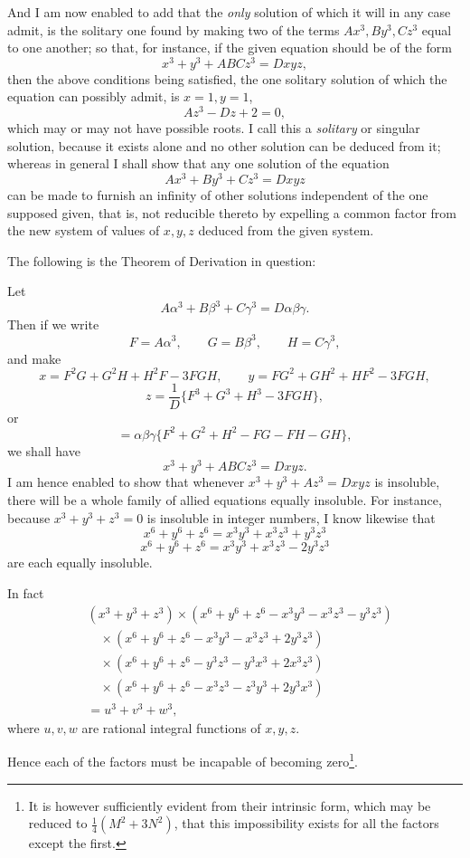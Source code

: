 \documentclass[11pt]{article}
\newcommand{\sourcepage}[1]{\marginpar{\scriptsize p.~#1}}
\begin{document}
\sourcepage{111}
And I am now enabled to add that the \emph{only} solution of which it will in any case admit, is the solitary one found by making two of the terms $Ax^3,By^3,Cz^3$ equal to one another; so that, for instance, if the given equation should be of the form
\[
x^3+y^3+ABCz^3=Dxyz,
\]
then the above conditions being satisfied, the one solitary solution of which the equation can possibly admit, is $x=1,y=1$,
\[
Az^3-Dz+2=0,
\]
which may or may not have possible roots. I call this a \emph{solitary} or singular solution, because it exists alone and no other solution can be deduced from it; whereas in general I shall show that any one solution of the equation
\[
Ax^3+By^3+Cz^3=Dxyz
\]
can be made to furnish an infinity of other solutions independent of the one supposed given, that is, not reducible thereto by expelling a common factor from the new system of values of $x,y,z$ deduced from the given system.

The following is the Theorem of Derivation in question:

Let
\[
A\alpha^3+B\beta^3+C\gamma^3=D\alpha\beta\gamma.
\]
Then if we write
\[
F=A\alpha^3,\qquad G=B\beta^3,\qquad H=C\gamma^3,
\]
and make
\[
x=F^2G+G^2H+H^2F-3FGH,
\qquad
y=FG^2+GH^2+HF^2-3FGH,
\]
\[
z=\frac{1}{D}\{F^3+G^3+H^3-3FGH\},
\]
or
\[
=\alpha\beta\gamma\{F^2+G^2+H^2-FG-FH-GH\},
\]
we shall have
\[
x^3+y^3+ABCz^3=Dxyz.
\]
I am hence enabled to show that whenever $x^3+y^3+Az^3=Dxyz$ is insoluble, there will be a whole family of allied equations equally insoluble. For instance, because $x^3+y^3+z^3=0$ is insoluble in integer numbers, I know likewise that
\[
x^6+y^6+z^6=x^3y^3+x^3z^3+y^3z^3
\]
\[
x^6+y^6+z^6=x^3y^3+x^3z^3-2y^3z^3
\]
are each equally insoluble.

\sourcepage{112}
In fact
\[
\begin{aligned}
&(x^3+y^3+z^3)\times(x^6+y^6+z^6-x^3y^3-x^3z^3-y^3z^3)\\
&\quad\times(x^6+y^6+z^6-x^3y^3-x^3z^3+2y^3z^3)\\
&\quad\times(x^6+y^6+z^6-y^3z^3-y^3x^3+2x^3z^3)\\
&\quad\times(x^6+y^6+z^6-x^3z^3-z^3y^3+2y^3x^3)\\
&=u^3+v^3+w^3,
\end{aligned}
\]
where $u,v,w$ are rational integral functions of $x,y,z$.

Hence each of the factors must be incapable of becoming zero\footnote{It is however sufficiently evident from their intrinsic form, which may be reduced to $\frac14(M^2+3N^2)$, that this impossibility exists for all the factors except the first.}.
\end{document}
